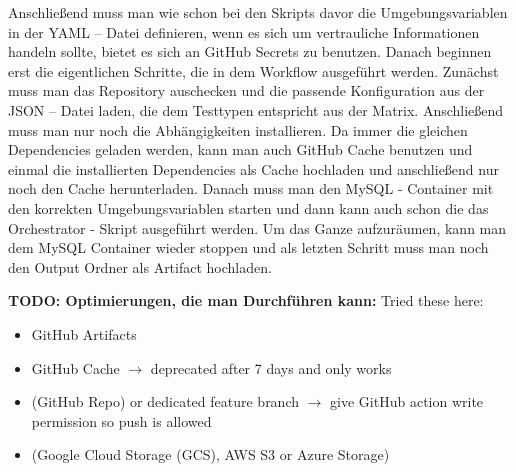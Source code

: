 

Anschließend muss man wie schon bei den Skripts davor die Umgebungsvariablen in der YAML – Datei definieren, wenn es sich um vertrauliche Informationen handeln sollte, bietet es sich an GitHub Secrets zu benutzen.
Danach beginnen erst die eigentlichen Schritte, die in dem Workflow ausgeführt werden.
Zunächst muss man das Repository auschecken und die passende Konfiguration aus der JSON – Datei laden, die dem Testtypen entspricht aus der Matrix.
Anschließend muss man nur noch die Abhängigkeiten installieren.
Da immer die gleichen Dependencies geladen werden, kann man auch GitHub Cache benutzen und einmal die installierten Dependencies als Cache hochladen und anschließend nur noch den Cache herunterladen.
Danach muss man den MySQL - Container mit den korrekten Umgebungsvariablen starten und dann kann auch schon die das Orchestrator - Skript ausgeführt werden.
Um das Ganze aufzuräumen, kann man dem MySQL Container wieder stoppen und als letzten Schritt muss man noch den Output Ordner als Artifact hochladen.



\textbf{TODO: Optimierungen, die man Durchführen kann:}
\newline Tried these here:
\begin{itemize}
    \item GitHub Artifacts
    \item GitHub Cache $\rightarrow$ deprecated after 7 days and only works
    \item (GitHub Repo) or dedicated feature branch $\rightarrow$ give GitHub action write permission so push is allowed
    \item (Google Cloud Storage (GCS), AWS S3 or Azure Storage)
\end{itemize}